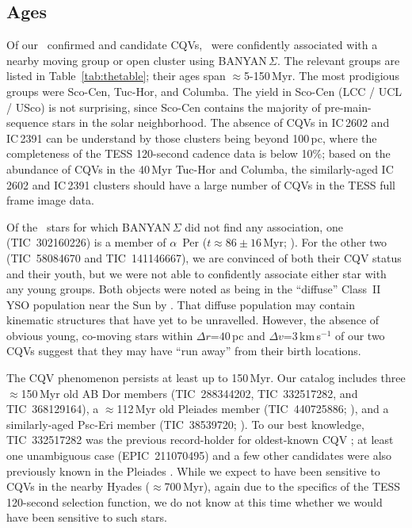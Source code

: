 \documentclass[11pt,twocolumn,tighten]{aastex63}
\begin{document}
\subsection{Ages}

Of our \ncpvsfound\ confirmed and candidate CQVs, \nnotfieldbanyan\
were confidently associated with a nearby moving group or open cluster
using BANYAN\,$\Sigma$.  The relevant groups are listed in
Table~\ref{tab:thetable}; their ages span $\approx$5-150\,Myr.  The
most prodigious groups were Sco-Cen, Tuc-Hor, and Columba.  The yield
in Sco-Cen (LCC / UCL / USco) is not surprising, since Sco-Cen
contains the majority of pre-main-sequence stars in the solar
neighborhood.  The absence of CQVs in IC\,2602 and IC\,2391 can be
understand by those clusters being beyond 100\,pc, where the
completeness of the TESS 120-second cadence data is below 10\%; based
on the abundance of CQVs in the 40\,Myr Tuc-Hor and Columba, the
similarly-aged IC\,2602 and IC\,2391 clusters should have a large
number of CQVs in the TESS full frame image data.

Of the \ngoodsfieldbanyan\ stars for which BANYAN\,$\Sigma$ did not
find any association, one (TIC~302160226) is a member of $\alpha$~Per
($t\approx 86\pm16$\,Myr;
\citealt{2021A&A...645A..84M,2022arXiv221109822B}).  For the other two
(TIC~58084670 and TIC~141146667), we are convinced of both their CQV
status and their youth, but we were not able to confidently associate
either star with any young groups.  Both objects were noted as being in the
``diffuse'' Class~II YSO population near the Sun by \citet{2021ApJ...917...23K}.
That diffuse population may contain kinematic structures that have yet
to be unravelled.  However, the absence of obvious young, co-moving
stars within $\Delta r$=$40$\,pc and $\Delta v$=$3$\,km\,s$^{-1}$ of
our two CQVs suggest that they may have ``run away'' from their birth
locations.

The CQV phenomenon persists at least up to 150\,Myr.  Our catalog
includes three $\approx$150\,Myr old AB Dor members (TIC~288344202,
TIC~332517282, and TIC~368129164), a $\approx$112\,Myr old Pleiades
member (TIC~440725886; \citealt{CantatGaudin_2020}), and a
similarly-aged Psc-Eri member (TIC~38539720;
\citealt{2020A&A...639A..64R}).  To our best knowledge, TIC~332517282
was the previous record-holder for oldest-known CQV
\citep{2019ApJ...876..127Z,2022AJ....163..144G}; at least one
unambiguous case (EPIC~211070495) and a few other candidates were also
previously known in the Pleiades \citep{2016AJ....152..114R}.  While
we expect to have been sensitive to CQVs in the nearby Hyades
($\approx$700\,Myr), again due to the specifics of the TESS 120-second
selection function, we do not know at this time whether we would have
been sensitive to such stars.
\end{document}
